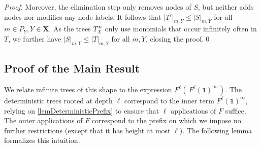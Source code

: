 \documentclass[english,runningheads,a4paper,envcountsame]{llncs}
\newcommand*{\XX}{{\bm X}}
\newcommand*{\moncount}[3]{|{#1}|_{#2,#3}}
\newcommand{\one}{\tup 1}
\newcommand*{\tup}[1]{\mathbf{#1}}
\begin{document}
\begin{proof}
Moreover, the elimination step only removes nodes of $S$, but neither adds nodes nor modifies any node labels.
It follows that $\moncount {T'} m Y \le \moncount S m Y$ for all $m \in P_Y, Y \in \XX$.
As the trees $T_X^\infty$ only use monomials that occur infinitely often in $T$, we further have $\moncount S m Y \le \moncount T m Y$ for all $m,Y$, closing the proof.\qed
\end{proof}


\subsection{Proof of the Main Result}

We relate infinite trees of this shape to the expression $F^\ell(\,F^\ell(\one)^\infty \,)$.
The deterministic trees rooted at depth $\ell$ correspond to the inner term $F^\ell(\one)^\infty$, relying on \cref{lemDeterministicPrefix} to ensure that $\ell$ applications of $F$ suffice.
The outer applications of $F$ correspond to the prefix on which we impose no further restrictions (except that it has height at most $\ell$).
The following lemma formalizes this intuition.
\end{document}
